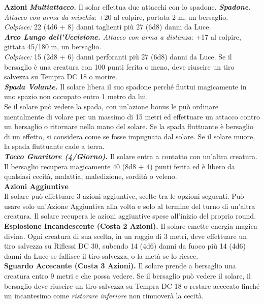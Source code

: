 \begin{multicols}{2}
\smallskip\textbf{Azioni}
\emph{\textbf{Multiattacco.}} Il solar effettua due attacchi con lo spadone.
\emph{\textbf{Spadone.} Attacco con arma da mischia}: +20 al colpire, portata 2 m, un bersaglio.\\
\emph{Colpisce:} 22 (4d6 + 8) danni taglienti più 27 (6d8) danni da Luce.\\
\emph{\textbf{Arco Lungo dell'Uccisione.} Attacco con arma a distanza}: +17 al colpire, gittata 45/180 m, un bersaglio.\\
\emph{Colpisce:} 15 (2d8 + 6) danni perforanti più 27 (6d8) danni da Luce. Se il bersaglio è una creatura con 100 punti ferita o meno, deve riuscire un tiro salvezza su Tempra DC  18 o morire. \\
\emph{\textbf{Spada Volante.}} Il solare libera il suo spadone perché fluttui magicamente in uno spazio non occupato entro 1 metro da lui.\\
Se il solare può vedere la spada, con un'azione bonus le può ordinare mentalmente di volare per un massimo di 15 metri ed effettuare un attacco contro un bersaglio o ritornare nella mano del solare. Se la spada fluttuante è bersaglio di un effetto, si considera come se fosse impugnata dal solare. Se il solare muore, la spada fluttuante cade a terra.\\
\emph{\textbf{Tocco Guaritore (4/Giorno).}} Il solare entra a contatto con  un'altra creatura. Il bersaglio recupera magicamente 40 (8d8 + 4) punti ferita ed è libero da qualsiasi cecità, malattia, maledizione, sordità o veleno.\\
\textbf{Azioni Aggiuntive}\\
Il solare può effettuare 3 azioni aggiuntive, scelte tra le opzioni seguenti. Può usare solo un'Azione Aggiuntiva alla volta e solo al termine del turno di un'altra creatura. Il solare recupera le azioni aggiuntive spese all'inizio del proprio round. \\
\textbf{Esplosione Incandescente (Costa 2 Azioni).} Il solare emette energia magica divina. Ogni creatura di sua scelta, in un raggio di 3 metri, deve effettuare un tiro salvezza su Riflessi DC  30, subendo 14 (4d6) danni da fuoco più 14 (4d6) danni da Luce se fallisce il tiro salvezza, o la metà se lo riesce. \\ 
\textbf{Sguardo Accecante (Costa 3 Azioni).} Il solare prende a bersaglio una creatura entro 9 metri e che possa vedere. Se il bersaglio può vedere il solare, il bersaglio deve riuscire un tiro salvezza su Tempra DC  18 o restare accecato finché un incantesimo come \emph{ristorare inferiore} non rimuoverà la cecità.\\

\end{multicols}
